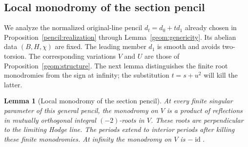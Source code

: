 \documentclass[11pt]{amsart}
\DeclareMathOperator{\id}{id}
\newtheorem{lemma}[theorem]{Lemma}
\theoremstyle{definition}
\theoremstyle{remark}
\numberwithin{equation}{section}
\begin{document}
\subsection{Local monodromy of the section pencil}

We analyze the normalized original-line pencil \(d_t=d_0+t d_1\)
already chosen in Proposition~\ref{pencil:realization} through
Lemma~\ref{geom:genericity}.  Its abelian data \((B,H,\chi)\) are fixed.
The leading member \(d_1\) is
smooth and avoids two-torsion.  The corresponding variations \(V\)
and \(U\) are those of Proposition~\ref{geom:structure}.
The next lemma distinguishes the finite root monodromies from the
sign at infinity; the substitution \(t=s+u^2\) will kill the latter.

\begin{lemma}[Local monodromy of the section pencil]
\label{pencil:monodromy}
At every finite singular parameter of this general pencil, the
monodromy on \(V\) is a product of reflections in mutually orthogonal
integral \((-2)\)-roots in \(V\).  These roots are perpendicular to the
limiting Hodge line.  The periods extend to interior periods after
killing these finite monodromies.  At infinity the monodromy on \(V\)
is \(-\id\).
\end{lemma}
\end{document}
